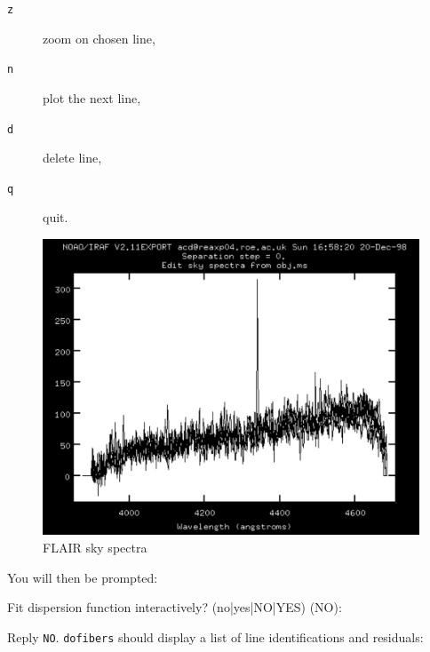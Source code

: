 \documentclass[twoside,11pt]{starlink}
\begin{document}
\begin{enumerate}
  \begin{description}

    \item[\texttt{z}] zoom on chosen line,

    \item[\texttt{n}] plot the next line,

    \item[\texttt{d}] delete line,

    \item[\texttt{q}] quit.

  \end{description}

  \begin{figure}[htbp]
     \centering
     \includegraphics[totalheight=4in]{sc14_flair_sky}
     \caption{FLAIR sky spectra
     \label{FLAIR_SKY} }
  \end{figure}

   You will then be prompted:

\begin{terminalv}
Fit dispersion function interactively? (no|yes|NO|YES) (NO):
\end{terminalv}

   Reply \texttt{NO}.  \texttt{dofibers} should display a list of line
   identifications and residuals:


\end{enumerate}
\end{document}
